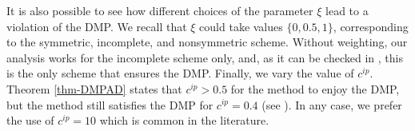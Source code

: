 It is also possible to see how different choices of the parameter $\xi$ lead to a violation of the DMP. We recall that $\xi$ could take values $\{0,0.5,1\}$, corresponding to the symmetric, incomplete, and nonsymmetric scheme. Without weighting, our analysis works for the incomplete scheme only, and, as it can be checked in , this is the only scheme that ensures the DMP. Finally, we vary the value of $c^{ip}$. Theorem \ref{thm-DMPAD} states that $c^{ip} > 0.5$ for the method to enjoy the DMP, but the method still satisfies the DMP for $c^{ip} = 0.4$ (see ). In any case, we prefer the use of $c^{ip} = 10$ which is common in the literature.
\begin{figure}
\centering
{}%
\caption{}\label{fig-sharpness}
\end{figure}

